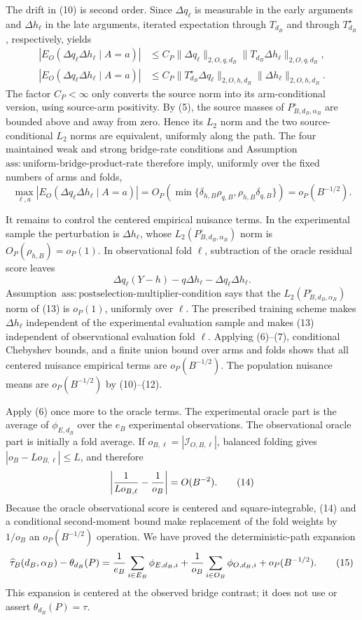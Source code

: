 The drift in (10) is second order.  Since \(\Delta q_\ell\) is measurable in the early arguments and \(\Delta h_\ell\) in the late arguments, iterated expectation through \(T_{d_B}\) and through \(T_{d_B}^\star\), respectively, yields
\[
\begin{aligned}
 |E_O(\Delta q_\ell\Delta h_\ell\mid A=a)|
 &\le C_P\|\Delta q_\ell\|_{2,O,q,d_B}
          \|T_{d_B}\Delta h_\ell\|_{2,O,q,d_B},\\
 |E_O(\Delta q_\ell\Delta h_\ell\mid A=a)|
 &\le C_P\|T_{d_B}^\star\Delta q_\ell\|_{2,O,h,d_B}
          \|\Delta h_\ell\|_{2,O,h,d_B}.
\end{aligned} \tag{11}
\]
The factor \(C_P<\infty\) only converts the source norm into its arm-conditional version, using source-arm positivity.  By (5), the source masses of \(P_{B,d_B,\alpha_B}^{\circ}\) are bounded above and away from zero.  Hence its \(L_2\) norm and the two source-conditional \(L_2\) norms are equivalent, uniformly along the path.  The four maintained weak and strong bridge-rate conditions and Assumption~\(\mathrm{ass{:}uniform\text{-}bridge\text{-}product\text{-}rate}\) therefore imply, uniformly over the fixed numbers of arms and folds,
\[
 \max_{\ell,a}|E_O(\Delta q_\ell\Delta h_\ell\mid A=a)|
 =O_P\!\left(\min\{\delta_{h,B}\rho_{q,B},
                         \rho_{h,B}\delta_{q,B}\}\right)
 =o_P(B^{-1/2}). \tag{12}
\]

It remains to control the centered empirical nuisance terms.  In the experimental sample the perturbation is \(\Delta h_\ell\), whose \(L_2(P_{B,d_B,\alpha_B}^{\circ})\) norm is \(O_P(\rho_{h,B})=o_P(1)\).  In observational fold \(\ell\), subtraction of the oracle residual score leaves
\[
 \Delta q_\ell(Y-h)-q\Delta h_\ell-\Delta q_\ell\Delta h_\ell. \tag{13}
\]
Assumption~\(\mathrm{ass{:}postselection\text{-}multiplier\text{-}condition}\) says that the \(L_2(P_{B,d_B,\alpha_B}^{\circ})\) norm of (13) is \(o_P(1)\), uniformly over \(\ell\).  The prescribed training scheme makes \(\Delta h_\ell\) independent of the experimental evaluation sample and makes (13) independent of observational evaluation fold \(\ell\).  Applying (6)--(7), conditional Chebyshev bounds, and a finite union bound over arms and folds shows that all centered nuisance empirical terms are \(o_P(B^{-1/2})\).  The population nuisance means are \(o_P(B^{-1/2})\) by (10)--(12).

Apply (6) once more to the oracle terms.  The experimental oracle part is the average of \(\phi_{E,d_B}\) over the \(e_B\) experimental observations.  The observational oracle part is initially a fold average.  If \(o_{B,\ell}=|\mathcal I_{O,B,\ell}|\), balanced folding gives \(|o_B-Lo_{B,\ell}|\le L\), and therefore
\[
 \left|{1\over Lo_{B,\ell}}-{1\over o_B}\right|=O(B^{-2}). \tag{14}
\]
Because the oracle observational score is centered and square-integrable, (14) and a conditional second-moment bound make replacement of the fold weights by \(1/o_B\) an \(o_P(B^{-1/2})\) operation.  We have proved the deterministic-path expansion
\[
 \widehat\tau_B(d_B,\alpha_B)-\theta_{d_B}(P)
 ={1\over e_B}\sum_{i\in E_B}\phi_{E,d_B,i}
  +{1\over o_B}\sum_{i\in O_B}\phi_{O,d_B,i}
  +o_P(B^{-1/2}). \tag{15}
\]
This expansion is centered at the observed bridge contrast; it does not use or assert \(\theta_{d_B}(P)=\tau\).

